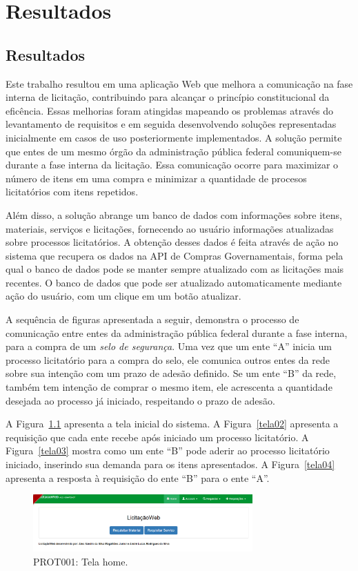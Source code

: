 \part{Resultados}

\chapter[Resultados]{Resultados}\label{Capitulo5}

Este trabalho resultou em uma aplicação Web que melhora a comunicação na fase interna de licitação, contribuindo para alcançar o princípio constitucional da eficência.
Essas melhorias foram atingidas mapeando os problemas através do levantamento de requisitos e em seguida desenvolvendo soluções representadas inicialmente em casos de uso posteriormente implementados.
A solução permite que entes de um mesmo órgão da administração pública federal comuniquem-se durante a fase interna da licitação.
Essa comunicação ocorre para maximizar o número de itens em uma compra e minimizar a quantidade de procesos licitatórios com itens repetidos.

Além disso, a solução abrange um banco de dados com informações sobre itens, materiais, serviços e licitações, fornecendo ao usuário informações atualizadas sobre processos licitatórios.
A obtenção desses dados é feita através de ação no sistema que recupera os dados na API de Compras Governamentais, forma pela qual o banco de dados pode se manter sempre atualizado com as licitações mais recentes.
O banco de dados que pode ser atualizado automaticamente mediante ação do usuário, com um clique em um botão atualizar.

A sequência de figuras apresentada a seguir, demonstra o processo de comunicação entre entes da administração pública federal durante a fase interna, para a compra de um \textit{selo de segurança}.
Uma vez que um ente ``A'' inicia um processo licitatório para a compra do selo, ele comunica outros entes da rede sobre sua intenção  com um prazo de adesão definido.
Se um ente ``B'' da rede, também tem intenção de comprar o mesmo item, ele acrescenta a quantidade desejada ao processo já iniciado, respeitando o prazo de adesão.

A Figura~\ref{tela01} apresenta a tela inicial do sistema.
A Figura~\ref{tela02} apresenta a requisição que cada ente recebe após iniciado um processo licitatório.
A Figura~\ref{tela03} mostra como um ente ``B'' pode aderir ao processo licitatório iniciado, inserindo sua demanda para os itens apresentados.
A Figura~\ref{tela04} apresenta a resposta  à requisição do ente ``B'' para o ente ``A''.
\begin{figure}[htp]
	\centering
	\includegraphics[width=0.75\textwidth]{figuras/prototipo001.png}
	\caption[PROT001: Tela home]{PROT001: Tela home.}
	\label{tela01}
\end{figure}


